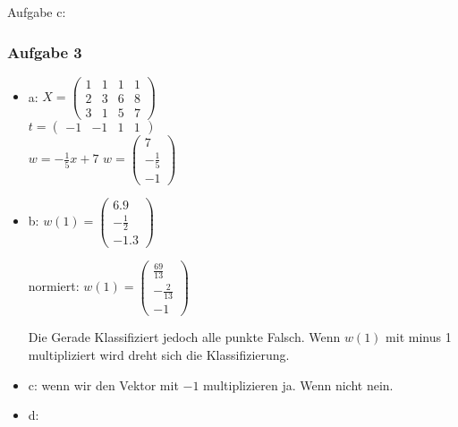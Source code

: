 \documentclass{article}
\begin{document}
Aufgabe c:


\subsubsection{Aufgabe 3}

\begin{itemize}
		\item a: $X= 
		\begin{pmatrix}
			1 & 1 & 1 & 1 \\
			2 & 3 & 6 & 8 \\
			3 & 1 & 5 & 7
		\end{pmatrix}$
		\\
		$t= \begin{pmatrix}
				-1 & -1 & 1 & 1
		\end{pmatrix}$
		\\
		$w = -\frac{1}{5}x + 7$
		$w = \begin{pmatrix}
			7\\
			-\frac{1}{5}\\
			-1
		\end{pmatrix}$
		
		\item b: 
		$w(1) = \begin{pmatrix}
			6.9 \\
			-\frac{1}{2}\\
			-1.3
		\end{pmatrix}$
		
		normiert: 
		$w(1) = \begin{pmatrix}
		\frac{69}{13} \\
		-\frac{2}{13}\\
		-1
		\end{pmatrix}$
		
		\begin{figure}[h]
		\end{figure}
		Die Gerade Klassifiziert jedoch alle punkte Falsch. Wenn $w(1)$ mit minus 1 multipliziert wird dreht sich die Klassifizierung.
		
		\item c: wenn wir den Vektor mit $-1$ multiplizieren ja. Wenn nicht nein.
		
		\item d: 
\end{itemize}
\end{document}
